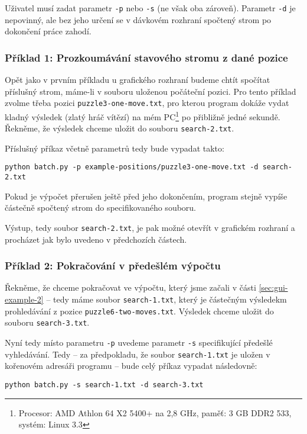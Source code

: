 \documentclass{article}
\begin{document}
Uživatel musí zadat parametr \texttt{-p} nebo \texttt{-s} (ne však oba zároveň).
Parametr \texttt{-d} je nepovinný, ale bez jeho určení se v dávkovém rozhraní
spočtený strom po dokončení práce zahodí.

\subsubsection{Příklad 1: Prozkoumávání stavového stromu z dané pozice}
Opět jako v prvním příkladu u grafického rozhraní budeme chtít spočítat 
příslušný strom, máme-li v souboru uloženou počáteční pozici. Pro tento příklad 
zvolme třeba pozici \texttt{puzzle3-one-move.txt}, pro kterou program dokáže 
vydat kladný výsledek (zlatý hráč vítězí) na mém PC\footnote{Procesor: AMD 
Athlon 64 X2 5400+ na 2,8 GHz, paměť: 3 GB DDR2 533, systém: Linux 3.3}  po 
přibližně jedné sekundě. Řekněme, že výsledek chceme uložit do souboru
\texttt{search-2.txt}.

Příslušný příkaz včetně parametrů tedy bude vypadat takto:
\begin{center}\texttt{python batch.py -p example-positions/puzzle3-one-move.txt 
-d search-2.txt}\end{center}

Pokud je výpočet přerušen ještě před jeho dokončením, program stejně vypíše
částečně spočtený strom do specifikovaného
souboru.

Výstup, tedy soubor \texttt{search-2.txt}, je pak možné otevřít v grafickém
rozhraní a procházet jak bylo uvedeno v předchozích částech.

\subsubsection{Příklad 2: Pokračování v předešlém výpočtu}
Řekněme, že chceme pokračovat ve výpočtu, který jsme začali v části
\ref{sec:gui-example-2} -- tedy máme soubor \texttt{search-1.txt}, který je 
částečným výsledekm prohledávání z pozice \texttt{puzzle6-two-moves.txt}.
Výsledek chceme uložit do souboru \texttt{search-3.txt}.

Nyní tedy místo parametru \texttt{-p} uvedeme parametr \texttt{-s} specifikující
předešlé vyhledávání. Tedy -- za předpokladu, že soubor \texttt{search-1.txt} je 
uložen v kořenovém adresáři programu -- bude celý příkaz vypadat následovně:
\begin{center}\texttt{python batch.py -s search-1.txt -d search-3.txt}
\end{center}
\end{document}

